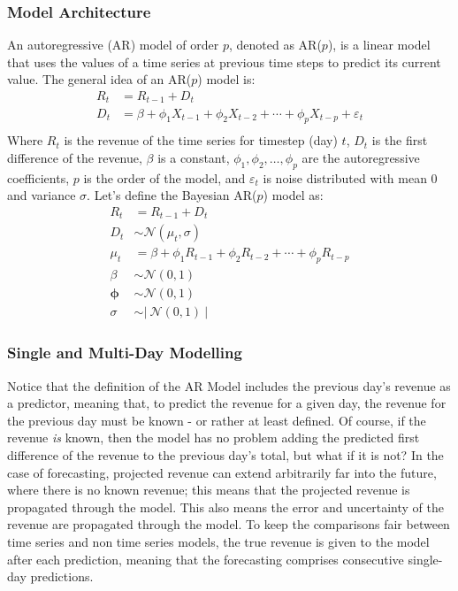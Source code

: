 \subsubsection{Model Architecture}
An autoregressive (AR) model of order $p$, denoted as AR($p$), is a linear
model that uses the values of a time series at previous time steps to predict
its current value. The general idea of an AR($p$) model is:
\begin{equation}
  \label{eq:ar_model}
  \begin{split}
    R_t &= R_{t-1} + D_t \\
    D_t &= \beta + \phi_1 X_{t-1} + \phi_2 X_{t-2} + \cdots + \phi_p X_{t-p} + \varepsilon_t \\
  \end{split}
\end{equation}
Where $R_t$ is the revenue of the time series for timestep (day) $t$, $D_t$ is
the first difference of the revenue, $\beta$ is a constant, $\phi_1, \phi_2, \dots,
\phi_p$ are the autoregressive coefficients, $p$ is the order of the model, and
$\varepsilon_t$ is noise distributed with mean 0 and variance $\sigma$.
Let's define the Bayesian AR($p$) model as: 
\begin{equation}
  \begin{split}
    R_t &= R_{t-1} + D_t \\
    D_t &\sim \mathcal{N}(\mu_t, \sigma) \\
    \mu_t &= \beta + \phi_1 R_{t-1} + \phi_2 R_{t-2} + \cdots + \phi_p R_{t-p} \\
    \beta &\sim \mathcal{N}(0, 1) \\
    \boldsymbol{\phi} &\sim \mathcal{N}(0, 1) \\
    \sigma &\sim \left| \ \mathcal{N}(0,1) \ \right|
  \end{split}
\end{equation}
\subsubsection{Single and Multi-Day Modelling}
Notice that the definition of the AR Model includes the previous day's revenue
as a predictor, meaning that, to predict the revenue for a given day,
the revenue for the previous day must be known - or rather at least defined. Of
course, if the revenue \textit{is} known, then the model has no problem adding
the predicted first difference of the revenue to the previous day's total, but
what if it is not? In the case of forecasting, projected revenue can extend
arbitrarily far into the future, where there is no known revenue;
this means that the projected revenue is propagated through the model. This
also means the error and uncertainty of the revenue are propagated through the
model. To keep the comparisons fair between time series and non time series
models, the true revenue is given to the model after each prediction, meaning 
that the forecasting comprises consecutive single-day predictions.
